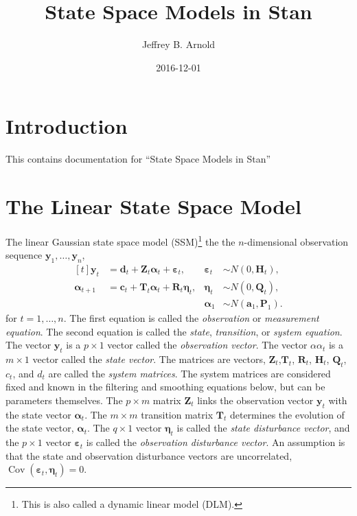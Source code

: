 \documentclass[]{book}
\title{State Space Models in Stan}
\author{Jeffrey B. Arnold}
\date{2016-12-01}
\let\rmarkdownfootnote\footnote%
\def\footnote{\protect\rmarkdownfootnote}
\DeclareMathOperator{\Cov}{Cov}
\newcommand{\mat}[1]{\boldsymbol{#1}}
\renewcommand{\vec}[1]{\boldsymbol{#1}}
\begin{document}
\maketitle

{
\setcounter{tocdepth}{1}
\tableofcontents
}
\chapter{Introduction}\label{introduction}

This contains documentation for ``State Space Models in Stan''

\chapter{The Linear State Space
Model}\label{the-linear-state-space-model}

\autocite[Sec 3.1]{DurbinKoopman2012}

The linear Gaussian state space model (SSM)\footnote{This is also called
  a dynamic linear model (DLM).} the the \(n\)-dimensional observation
sequence \(\vec{y}_1, \dots, \vec{y}_n\), \[
\begin{aligned}[t]
\vec{y}_t &= \vec{d}_t + \mat{Z}_t \vec{\alpha}_t + \vec{\varepsilon}_t,  &
\vec{\varepsilon}_t & \sim N(0, \mat{H}_t), \\
\vec{\alpha}_{t + 1} &= \vec{c}_t + \mat{T}_t \vec{\alpha}_t + \mat{R}_t \vec{\eta}_t,  &
\vec{\eta}_t & \sim N(0, \mat{Q}_t), \\
&& \vec{\alpha}_1 &\sim N(\vec{a}_1, \mat{P}_1) .
\end{aligned}
\] for \(t = 1, \dots, n\). The first equation is called the
\emph{observation} or \emph{measurement equation}. The second equation
is called the \emph{state}, \emph{transition}, or \emph{system
equation}. The vector \(\vec{y}_t\) is a \(p \times 1\) vector called
the \emph{observation vector}. The vector \(\alpha{\alpha}_t\) is a
\(m \times 1\) vector called the \emph{state vector}. The matrices are
vectors, \(\mat{Z}_t\),\(\mat{T}_t\), \(\mat{R}_t\), \(\mat{H}_t\),
\(\mat{Q}_t\), \(c_t\), and \(d_t\) are called the \emph{system
matrices}. The system matrices are considered fixed and known in the
filtering and smoothing equations below, but can be parameters
themselves. The \(p \times m\) matrix \(\mat{Z}_t\) links the
observation vector \(\vec{y}_t\) with the state vector
\(\vec{\alpha}_t\). The \(m \times m\) transition matrix \(\mat{T}_t\)
determines the evolution of the state vector, \(\vec{\alpha}_t\). The
\(q \times 1\) vector \(\vec{\eta}_t\) is called the \emph{state
disturbance vector}, and the \(p \times 1\) vector
\(\vec{\varepsilon}_t\) is called the \emph{observation disturbance
vector}. An assumption is that the state and observation disturbance
vectors are uncorrelated,
\(\Cov(\vec{\varepsilon}_t, \vec{\eta}_t) = 0\).
\end{document}
